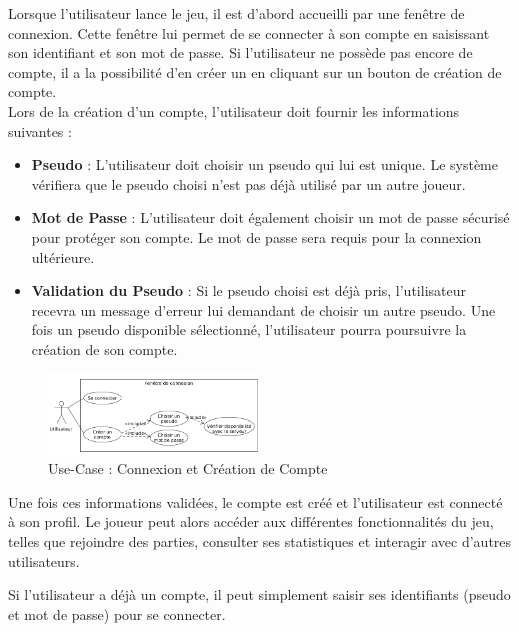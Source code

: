 \documentclass{report}
\begin{document}
\noindent Lorsque l’utilisateur lance le jeu, il est d'abord accueilli par une fenêtre de connexion. Cette fenêtre lui permet de se connecter à son compte en saisissant son identifiant et son mot de passe. Si l'utilisateur ne possède pas encore de compte, il a la possibilité d'en créer un en cliquant sur un bouton de création de compte. \\

\noindent Lors de la création d'un compte, l'utilisateur doit fournir les informations suivantes :
\begin{itemize}
    \item \textbf{Pseudo} : L'utilisateur doit choisir un pseudo qui lui est unique. Le système vérifiera que le pseudo choisi n'est pas déjà utilisé par un autre joueur.
    \item \textbf{Mot de Passe} : L'utilisateur doit également choisir un mot de passe sécurisé pour protéger son compte. Le mot de passe sera requis pour la connexion ultérieure.
    \item \textbf{Validation du Pseudo} : Si le pseudo choisi est déjà pris, l'utilisateur recevra un message d'erreur lui demandant de choisir un autre pseudo. Une fois un pseudo disponible sélectionné, l'utilisateur pourra poursuivre la création de son compte. \\
\end{itemize}

\vspace{-2em}

\begin{figure}[H]
    \centering
     \includegraphics[width=0.5\textwidth, keepaspectratio]{src/user_req/connexion.png}
    \caption{Use-Case : Connexion et Création de Compte}
    \label{fig:use_case_connexion}
\end{figure}

\noindent Une fois ces informations validées, le compte est créé et l'utilisateur est connecté à son profil. Le joueur peut alors accéder aux différentes fonctionnalités du jeu, telles que rejoindre des parties, consulter ses statistiques et interagir avec d'autres utilisateurs.

\noindent Si l'utilisateur a déjà un compte, il peut simplement saisir ses identifiants (pseudo et mot de passe) pour se connecter.
\end{document}
